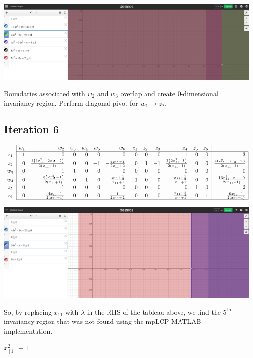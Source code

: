 \documentclass[12pt]{article}
\begin{document}
\begin{center}
\includegraphics[scale=.3]{Phase2_iteration5_visual}
\end{center}

Boundaries associated with $w_2$ and $w_3$ overlap and create 0-dimensional invariancy region. Perform diagonal pivot for $w_2 \rightarrow z_2$.

\subsection*{Iteration 6}

\renewcommand{\arraystretch}{1.5}
$\begin{array}{c|rrrrrrrrrrrr|r|}
\cline{2-13}
& w_1 & w_2 & w_3 & w_4 & w_5 & w_6 & z_1 & z_2 & z_3 & z_4 & z_5 & z_6 \\
\cline{2-14}
z_1 & 1 & 0 & 0 & 0 & 0 & 0 & 0 & 0 & 0 & 1 & 0 & 0 & 3 \\
z_2 & 0 & \frac{3 \left(6 x_{11}^{2} - 2 x_{11} - 5\right)}{2 \left(x_{11} + 1\right)} & 0 & 0 & -1 & - \frac{4 x_{11} + 1}{2 x_{11} + 2} & 0 & 1 & -1 & \frac{3 \left(2 x_{11}^{2} - 1\right)}{2 \left(x_{11} + 1\right)} & 0 & 0 & \frac{44 x_{11}^{2} - 9 x_{11} - 29}{2 \left(x_{11} + 1\right)} \\
w_3 & 0 & 1 & 1 & 0 & 0 & 0 & 0 & 0 & 0 & 0 & 0 & 0 & 0 \\
w_4 & 0 & \frac{3 \left(2 x_{11}^{2} - 1\right)}{2 \left(x_{11} + 1\right)} & 0 & 1 & 0 & - \frac{x_{11} + \frac{1}{2}}{x_{11} + 1} & -1 & 0 & 0 & - \frac{x_{11} + \frac{1}{2}}{x_{11} + 1} & 0 & 0 & \frac{16 x_{11}^{2} - x_{11} - 9}{2 \left(x_{11} + 1\right)} \\
z_5 & 0 & 1 & 0 & 0 & 0 & 0 & 0 & 0 & 0 & 0 & 1 & 0 & 2 \\
z_6 & 0 & \frac{4 x_{11} + 1}{2 \left(x_{11} + 1\right)} & 0 & 0 & 0 & - \frac{1}{2 x_{11} + 2} & 0 & 0 & 0 & \frac{x_{11} + \frac{1}{2}}{x_{11} + 1} & 0 & 1 &\frac{9 x_{11} + 1}{2 \left(x_{11} + 1\right)} \\
\cline{2-14}
\end{array}$

\begin{center}
\includegraphics[scale=.3]{Phase2_iteration6_visual_updated}
\end{center}

So, by replacing $x_{11}$ with $\lambda$ in the RHS of the tableau above, we find the $5^{\text{th}}$ invariancy region that was not found using the mpLCP MATLAB implementation.

$x_{[1]}^2
 + 1$
\end{document}
